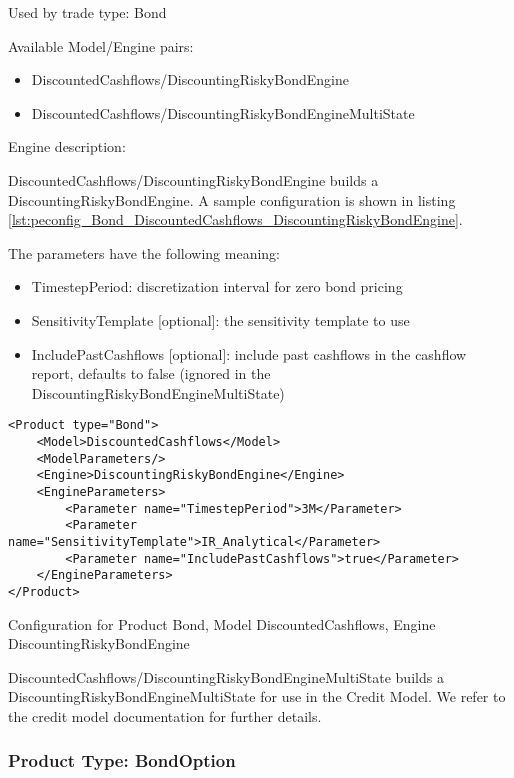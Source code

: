 Used by trade type: Bond

Available Model/Engine pairs:

\begin{itemize}
\item DiscountedCashflows/DiscountingRiskyBondEngine
\item DiscountedCashflows/DiscountingRiskyBondEngineMultiState
\end{itemize}

Engine description:

DiscountedCashflows/DiscountingRiskyBondEngine builds a DiscountingRiskyBondEngine. A sample configuration is shown
in listing \ref{lst:peconfig_Bond_DiscountedCashflows_DiscountingRiskyBondEngine}.

The parameters have the following meaning:

\begin{itemize}
\item TimestepPeriod: discretization interval for zero bond pricing
\item SensitivityTemplate [optional]: the sensitivity template to use 
\item IncludePastCashflows [optional]: include past cashflows in the cashflow report, defaults to false (ignored in the DiscountingRiskyBondEngineMultiState)
\end{itemize}

\begin{longlisting}
\begin{verbatim}
<Product type="Bond">
    <Model>DiscountedCashflows</Model>
    <ModelParameters/>
    <Engine>DiscountingRiskyBondEngine</Engine>
    <EngineParameters>
        <Parameter name="TimestepPeriod">3M</Parameter>
        <Parameter name="SensitivityTemplate">IR_Analytical</Parameter>
        <Parameter name="IncludePastCashflows">true</Parameter>
    </EngineParameters>
</Product>
\end{verbatim}
\caption{Configuration for Product Bond, Model DiscountedCashflows, Engine DiscountingRiskyBondEngine}
\label{lst:peconfig_Bond_DiscountedCashflows_DiscountingRiskyBondEngine}
\end{longlisting}

DiscountedCashflows/DiscountingRiskyBondEngineMultiState builds a DiscountingRiskyBondEngineMultiState for use in the
Credit Model. We refer to the credit model documentation for further details.

\subsubsection{Product Type: BondOption}

